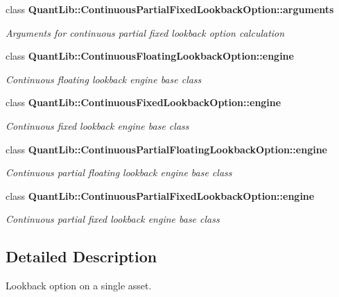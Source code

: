 \begin{DoxyCompactItemize}
class {\bf Quant\+Lib\+::\+Continuous\+Partial\+Fixed\+Lookback\+Option\+::arguments}
\begin{DoxyCompactList}\small\item\em Arguments for continuous partial fixed lookback option calculation \end{DoxyCompactList}\item 
class {\bf Quant\+Lib\+::\+Continuous\+Floating\+Lookback\+Option\+::engine}
\begin{DoxyCompactList}\small\item\em Continuous floating lookback engine base class \end{DoxyCompactList}\item 
class {\bf Quant\+Lib\+::\+Continuous\+Fixed\+Lookback\+Option\+::engine}
\begin{DoxyCompactList}\small\item\em Continuous fixed lookback engine base class \end{DoxyCompactList}\item 
class {\bf Quant\+Lib\+::\+Continuous\+Partial\+Floating\+Lookback\+Option\+::engine}
\begin{DoxyCompactList}\small\item\em Continuous partial floating lookback engine base class \end{DoxyCompactList}\item 
class {\bf Quant\+Lib\+::\+Continuous\+Partial\+Fixed\+Lookback\+Option\+::engine}
\begin{DoxyCompactList}\small\item\em Continuous partial fixed lookback engine base class \end{DoxyCompactList}\end{DoxyCompactItemize}


\subsection{Detailed Description}
Lookback option on a single asset. 

